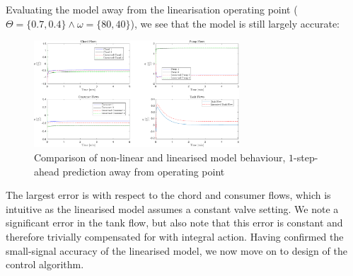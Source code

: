 Evaluating the model away from the linearisation operating point ($\Theta = \{0.7,0.4\} \wedge \omega = \{80,40\}$), we see that the model is still largely accurate:

\begin{figure}[h]
	\centering
	\includegraphics[height=4cm,width=\linewidth]{Graphics/DifferentOPFlows.pdf}
	\caption{Comparison of non-linear and linearised model behaviour, $1$-step-ahead prediction away from operating point}
	\label{fig:CompNonLinNotEQ}
\end{figure}

The largest error is with respect to the chord and consumer flows, which is intuitive as the linearised model assumes a constant valve setting. We note a significant error in the tank flow, but also note that this error is constant and therefore trivially compensated for with integral action. Having confirmed the small-signal accuracy of the linearised model, we now move on to design of the control algorithm.